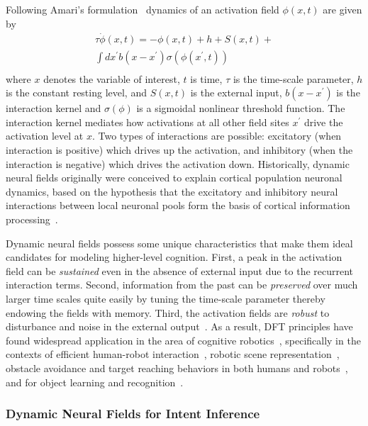 \documentclass[natbib, twocolumn]{svjour3}          %
\begin{document}
Following Amari's formulation~\citep{amari1977dynamics} dynamics of an activation field $\phi(x, t)$ are given by 
\begin{multline*}
\tau\dot{\phi}(x,t) = -\phi(x,t) + h + S(x,t) + \\ \int\limits_{}^{}dx^{\prime}b(x-x^{\prime})\sigma(\phi(x^{\prime}, t)) 
\end{multline*} 
where $x$ denotes the variable of interest, $t$ is time, $\tau$ is the time-scale parameter, $h$ is the constant resting level, and $S(x,t)$ is the external input, $b(x-x^\prime)$ is the interaction kernel and $\sigma(\phi)$ is a sigmoidal nonlinear threshold function. The interaction kernel mediates how activations at all other field sites $x^\prime$ drive the activation level at $x$. Two types of interactions are possible: excitatory (when interaction is positive) which drives up the activation, and inhibitory (when the interaction is negative) which drives the activation down. 
Historically, dynamic neural fields originally were conceived to explain cortical population neuronal dynamics, based on the hypothesis that the excitatory and inhibitory neural interactions between local neuronal pools form the basis of cortical information processing~\citep{wilson1973mathematical}. 

Dynamic neural fields possess some unique characteristics that make them ideal candidates for modeling higher-level cognition. First, a peak in the activation field can be \textit{sustained} even in the absence of external input due to the recurrent interaction terms. Second, information from the past can be \textit{preserved} over much larger time scales quite easily by tuning the time-scale parameter thereby endowing the fields with memory. Third, the activation fields are \textit{robust} to disturbance and noise in the external output~\citep{schoner2008dynamical}. 
As a result, DFT principles have found widespread application in the area of cognitive robotics~\citep{erlhagen2006dynamic}, specifically in the contexts of efficient human-robot interaction~\citep{erlhagen2014dynamic}, robotic scene representation~\citep{zibner2011dynamic}, obstacle avoidance and target reaching behaviors in both humans and robots~\citep{schoner1995dynamics}, and for object learning and recognition~\citep{faubel2008learning}. 


\subsubsection{Dynamic Neural Fields for Intent Inference}\label{sssec:dft_ii}
\end{document}

